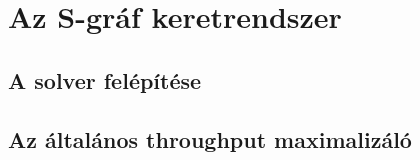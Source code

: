 \chapter{Az S-gráf keretrendszer} \label{s-graph_framework}
\section{A solver felépítése}
\section{Az általános throughput maximalizáló} \label{throughput_solver}